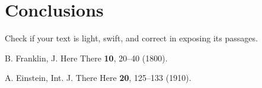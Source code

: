 \documentclass[prl,twocolumn]{revtex4-1}
\begin{document}
\section{Conclusions}


Check if your text is light, swift, and correct in exposing its passages.





\begin{thebibliography}{99}

  B. Franklin,
  J. Here There {\bf 10}, 20--40 (1800).
  
  A. Einstein,
  Int. J. There Here {\bf 20}, 125--133 (1910).
  
\end{thebibliography}

\clearpage

\end{document}
